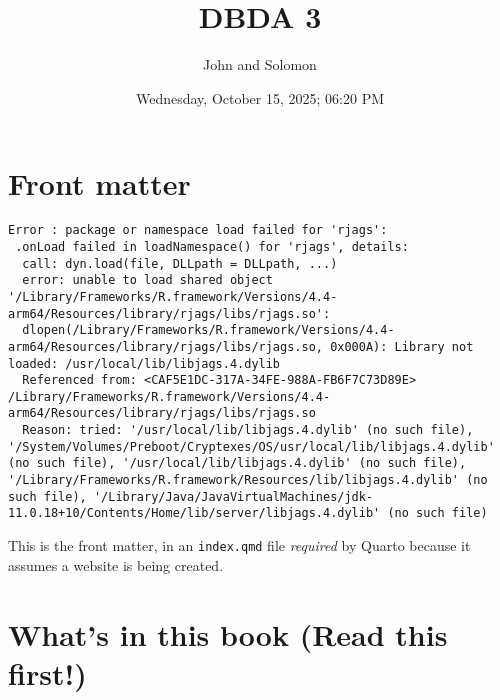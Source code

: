 \documentclass[
  12pt,
  letterpaper,
]{book}
\title{DBDA 3}
\author{John and Solomon}
\date{Wednesday, October 15, 2025; 06:20 PM}
\renewcommand*\contentsname{Table of contents}
\newcommand\contentsname{Table of contents}
\begin{document}
\frontmatter
\maketitle

\captionsetup[subfigure]{width=0.80\textwidth,font=small}
\captionsetup{width=0.90\textwidth,font=small}
\captionsetup{skip=5pt}
\captionsetup{belowskip=0pt}
\newcommand{\fixefsymbol}{\gamma}
\newcommand{\ranefsymbol}{\delta}

\renewcommand*\contentsname{Table of contents}
{
\hypersetup{linkcolor=}
\setcounter{tocdepth}{3}
\tableofcontents
}

\mainmatter
{}

\chapter*{Front matter}\label{front-matter}


\begin{verbatim}
Error : package or namespace load failed for 'rjags':
 .onLoad failed in loadNamespace() for 'rjags', details:
  call: dyn.load(file, DLLpath = DLLpath, ...)
  error: unable to load shared object '/Library/Frameworks/R.framework/Versions/4.4-arm64/Resources/library/rjags/libs/rjags.so':
  dlopen(/Library/Frameworks/R.framework/Versions/4.4-arm64/Resources/library/rjags/libs/rjags.so, 0x000A): Library not loaded: /usr/local/lib/libjags.4.dylib
  Referenced from: <CAF5E1DC-317A-34FE-988A-FB6F7C73D89E> /Library/Frameworks/R.framework/Versions/4.4-arm64/Resources/library/rjags/libs/rjags.so
  Reason: tried: '/usr/local/lib/libjags.4.dylib' (no such file), '/System/Volumes/Preboot/Cryptexes/OS/usr/local/lib/libjags.4.dylib' (no such file), '/usr/local/lib/libjags.4.dylib' (no such file), '/Library/Frameworks/R.framework/Resources/lib/libjags.4.dylib' (no such file), '/Library/Java/JavaVirtualMachines/jdk-11.0.18+10/Contents/Home/lib/server/libjags.4.dylib' (no such file)
\end{verbatim}

This is the front matter, in an \texttt{index.qmd} file \emph{required}
by Quarto because it assumes a website is being created.


\chapter{What's in this book (Read this first!)}\label{sec-overview}
\end{document}
